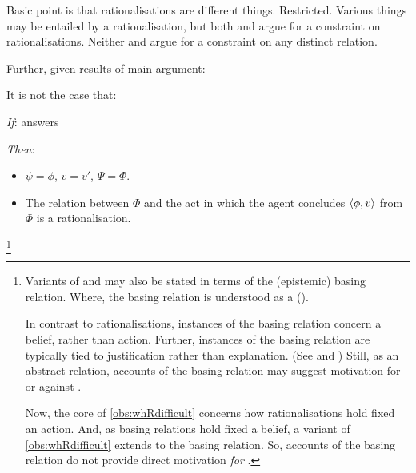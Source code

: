 \begin{note}
  Basic point is that rationalisations are different things.
  Restricted.
  Various things may be entailed by a rationalisation, but both \citeauthor{Davidson:1963aa} and \citeauthor{Hieronymi:2011aa} argue for a constraint on rationalisations.
  Neither \citeauthor{Davidson:1963aa} and \citeauthor{Hieronymi:2011aa} argue for a constraint on any distinct relation.
\end{note}

\begin{note}
  Further, given results of main argument:

  \begin{proposition}
    It is not the case that:
    \begin{itenum}
    \item[\emph{If}:]
       answers \qWhy{}
    \item[\emph{Then}:]
      \begin{itemize}
      \item
        \(\psi = \phi\), \(v = v'\), \(\Psi = \Phi\).
      \item
        The relation between \(\Phi\) and the act in which the agent concludes \(\langle\phi, v\rangle\) from \(\Phi\) is a rationalisation.
      \end{itemize}
    \end{itenum}
  \end{proposition}%
  \footnote{
    Variants of \qWhy{} and \qHow{} may also be stated in terms of the (epistemic) basing relation.
    Where, the basing relation is understood as a  (\cite{Korcz:2021ue}).

    In contrast to rationalisations, instances of the basing relation concern a belief, rather than action.
    Further, instances of the basing relation are typically tied to justification rather than explanation.
    (See \cite{Korcz:2021ue} and \cite[35]{Pollock:1999tm})
    Still, as an abstract relation, accounts of the basing relation may suggest motivation for or against \issueInclusion{}.

    Now, the core of \autoref{obs:whRdifficult} concerns how rationalisations hold fixed an action.
    And, as basing relations hold fixed a belief, a variant of \autoref{obs:whRdifficult} extends to the basing relation.
    So, accounts of the basing relation do not provide direct motivation \emph{for} \issueInclusion{}.

}
\end{note}

